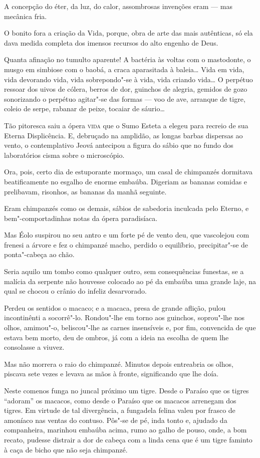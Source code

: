 A concepção do éter, da luz, do calor, assombrosas invenções eram ---
mas mecânica fria.

O bonito fora a criação da Vida, porque, obra de arte das mais
autênticas, só ela dava medida completa dos imensos recursos do alto
engenho de Deus.

Quanta afinação no tumulto aparente! A bactéria às voltas com o
mastodonte, o musgo em simbiose com o baobá, a craca aparasitada à
baleia\ldots{} Vida em vida, vida devorando vida, vida sobrepondo"-se à vida,
vida criando vida\ldots{} O perpétuo ressoar dos uivos de cólera, berros de
dor, guinchos de alegria, gemidos de gozo sonorizando o perpétuo
agitar"-se das formas --- voo de ave, arranque de tigre, coleio de serpe,
rabanar de peixe, tocaiar de sáurio\ldots{}

Tão pitoresca saiu a ópera \textsc{vida} que o Sumo Esteta a elegeu para recreio
de sua Eterna Displicência. E, debruçado na amplidão, as longas barbas
dispersas ao vento, o contemplativo Jeová antecipou a figura do sábio
que no fundo dos laboratórios cisma sobre o microscópio.

Ora, pois, certo dia de estuporante mormaço, um casal de chimpanzés
dormitava beatificamente no esgalho de enorme embaúba. Digeriam as
bananas comidas e prelibavam, risonhos, as bananas da manhã seguinte.

Eram chimpanzés como os demais, sábios de sabedoria inculcada pelo
Eterno, e bem"-comportadinhas notas da ópera paradisíaca.

Mas Éolo suspirou no seu antro e um forte pé de vento deu, que
vascolejou com frenesi a árvore e fez o chimpanzé macho, perdido o
equilíbrio, precipitar"-se de ponta"-cabeça ao chão.

Seria aquilo um tombo como qualquer outro, sem consequências funestas,
se a malícia da serpente não houvesse colocado ao pé da embaúba uma
grande laje, na qual se chocou o crânio do infeliz desarvorado.

Perdeu os sentidos o macaco; e a macaca, presa de grande aflição, pulou
incontinênti a socorrê"-lo. Rondou"-lhe em torno aos guinchos, soprou"-lhe
nos olhos, amimou"-o, beliscou"-lhe as carnes insensíveis e, por fim,
convencida de que estava bem morto, deu de ombros, já com a ideia na
escolha de quem lhe consolasse a viuvez.

Mas não morrera o raio do chimpanzé. Minutos depois entreabria os olhos,
piscava sete vezes e levava as mãos à fronte, significando que lhe doía.

Neste comenos funga no juncal próximo um tigre. Desde o Paraíso que os
tigres ``adoram'' os macacos, como desde o Paraíso que os macacos
arrenegam dos tigres. Em virtude de tal divergência, a fungadela felina
valeu por frasco de amoníaco nas ventas do contuso. Pôs"-se de pé, inda
tonto e, ajudado da companheira, marinhou embaúba acima, rumo ao galho
de pouso, onde, a bom recato, pudesse distrair a dor de cabeça com a
linda cena que é um tigre faminto à caça de bicho que não seja
chimpanzé.

